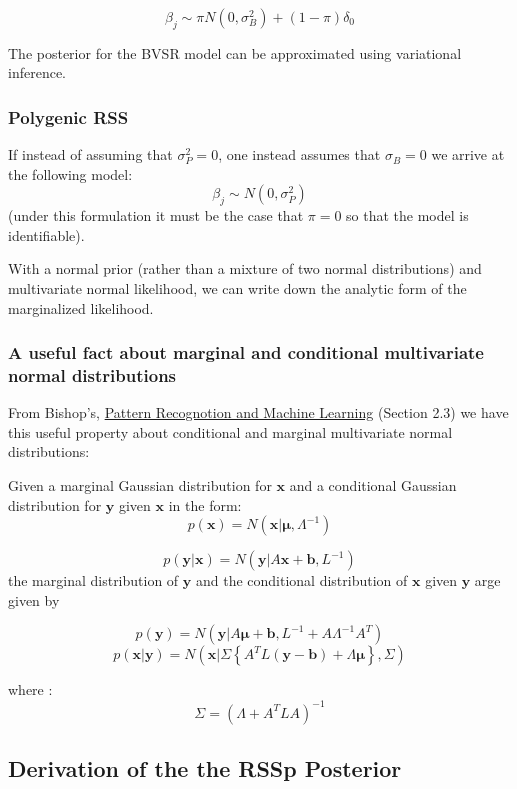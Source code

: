 $$ \beta_j \sim \pi N(0,\sigma^2_B)+(1-\pi) \delta_0 $$

The posterior for the BVSR model can be approximated using variational inference. 


\subsubsection{Polygenic RSS}\label{sec:org040cb73}

If instead of assuming that \(\sigma^2_P=0\), one instead assumes that \(\sigma_B=0\) we arrive at the following model: 
$$ \beta_j \sim N(0,\sigma^2_P)$$
(under this formulation it must be the case that \(\pi=0\) so that the model is identifiable).  

With a normal prior (rather than a mixture of two normal distributions) and multivariate normal likelihood, we can write down the analytic form of the marginalized likelihood.

\subsubsection{A useful fact about marginal and conditional multivariate normal distributions}\label{sec:orgc3a47cb}

From Bishop's, \uline{Pattern Recognotion and Machine Learning} (Section 2.3) \cite{patternrecognition} we have this useful property about conditional and marginal multivariate normal distributions:

Given a marginal Gaussian distribution for \(\textbf{x}\) and a conditional Gaussian distribution for \(\textbf{y}\) given \(\textbf{x}\) in the form:
$$p(\textbf{x}) = N(\textbf{x}|\boldsymbol{\mu},\Lambda^{-1})$$

$$p(\textbf{y}|\textbf{x}) = N(\textbf{y}|A\textbf{x}+\textbf{b},L^{-1})$$
the marginal distribution of \(\textbf{y}\) and the conditional distribution of \(\textbf{x}\) given \(\textbf{y}\) arge given by 

$$ p(\textbf{y}) = N(\textbf{y}|A\boldsymbol{\mu}+\textbf{b},L^{-1}+A\Lambda^{-1}A^{T})$$
$$p(\textbf{x}|\textbf{y}) = N(\textbf{x}| \Sigma \left\{ A^{T} L ( \textbf{y} - \textbf{b} ) + \Lambda \boldsymbol{\mu} \right\} , \Sigma)$$

where :
$$\Sigma = (\Lambda + A^{T}LA)^{-1}$$


\subsection{Derivation of the  the RSSp Posterior}\label{sec:orgb539917}



